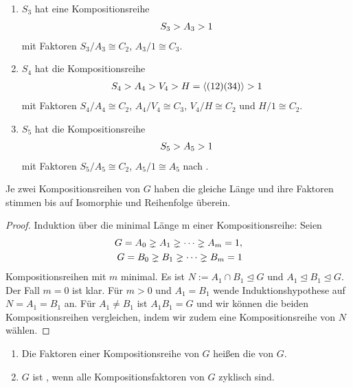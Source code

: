 \begin{example}
	\begin{enumerate}
		\item $S_3$ hat eine Kompositionsreihe
		\begin{align}
			S_3 > A_3 > 1 \notag
		\end{align}
		mit Faktoren $S_3 /A_3 \cong C_2$, $A_3/1 \cong C_3$.
		\item $S_4$ hat die Kompositionsreihe
		\begin{align}
			S_4 > A_4 > V_4 > H=\langle (12)(34)\rangle > 1 \notag
		\end{align}
		mit Faktoren $S_4/A_4 \cong C_2$, $A_4/V_4 \cong C_3$, $V_4/H \cong C_2 \text{ und } H/1\cong C_2$.
		\item $S_5$ hat die Kompositionsreihe
		\begin{align}
			S_5 > A_5 > 1\notag
		\end{align}
		mit Faktoren $S_5/A_5 \cong C_2$, $A_5/1 \cong A_5$ nach .
	\end{enumerate}
\end{example}

\begin{theorem}
	Je zwei Kompositionsreihen von $G$ haben die gleiche Länge und ihre Faktoren stimmen bis auf Isomorphie und Reihenfolge überein.
\end{theorem}

\begin{proof}
	 Induktion über die minimal Länge m einer Kompositionsreihe: Seien
	 \begin{align}
	 	G = A_0 \gneq A_1 \gneq \dotsm \gneq A_m = 1,\notag \\
	 	G = B_0 \gneq B_1 \gneq \dotsm \gneq B_m = 1\notag
	 \end{align}
	 Kompositionsreihen mit $m$ minimal. Es ist $N := A_1 \cap B_1 \unlhd G$ und $A_1 \unlhd B_1 \unlhd G$. Der Fall $m = 0$ ist klar. Für $m > 0$ und $A_1 = B_1$ wende Induktionshypothese auf $N = A_1 = B_1$ an.
	 Für $A_1 \neq B_1$ ist $A_1 B_1 = G$ und wir können die beiden Kompositionsreihen vergleichen, indem wir zudem eine Kompositionsreihe von $N$ wählen.
\end{proof}

\begin{definition}
	\begin{enumerate}
		\item Die Faktoren einer Kompositionsreihe von $G$ heißen die  von $G$.
		\item $G$ ist , wenn alle Kompositionsfaktoren von $G$ zyklisch sind.
	\end{enumerate}
\end{definition}

